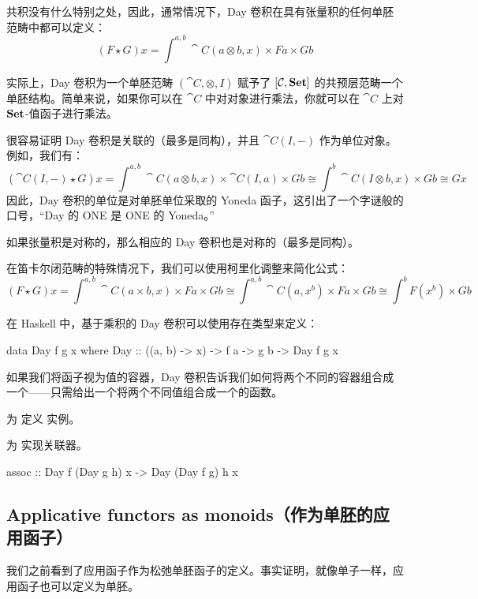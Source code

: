 \documentclass[DaoFP]{subfiles}
\begin{document}
 共积没有什么特别之处，因此，通常情况下，Day 卷积在具有张量积的任何单胚范畴中都可以定义：
 \[ (F \star G) x = \int^{a, b} \cat C (a \otimes b, x) \times F a \times G b \]

 实际上，Day 卷积为一个单胚范畴 $(\cat C, \otimes, I)$ 赋予了 $[\mathcal{C}, \mathbf{Set}]$ 的共预层范畴一个单胚结构。简单来说，如果你可以在 $\cat C$ 中对对象进行乘法，你就可以在 $\cat C$ 上对 $\mathbf{Set}$-值函子进行乘法。

 很容易证明 Day 卷积是关联的（最多是同构），并且 $\cat C(I, -)$ 作为单位对象。例如，我们有：
 \[ (\cat C(I, -) \star G) x =  \int^{a, b} \cat C (a \otimes b, x) \times \cat C(I, a) \times G b \cong
 \int^{b} \cat C (I \otimes b, x) \times  G b \cong G x\]
 因此，Day 卷积的单位是对单胚单位采取的 Yoneda 函子，这引出了一个字谜般的口号，“Day 的 ONE 是 ONE 的 Yoneda。”

 如果张量积是对称的，那么相应的 Day 卷积也是对称的（最多是同构）。

 在笛卡尔闭范畴的特殊情况下，我们可以使用柯里化调整来简化公式：
 \[ (F \star G) x = \int^{a, b} \cat C (a \times b, x) \times F a \times G b \cong  \int^{a, b} \cat C (a, x^b) \times F a \times G b \cong  \int^{b}  F (x^b) \times G b\]

 在 Haskell 中，基于乘积的 Day 卷积可以使用存在类型来定义：
 \begin{haskell}
  data Day f g x where
  Day :: ((a, b) -> x) -> f a -> g b -> Day f g x
 \end{haskell}

 如果我们将函子视为值的容器，Day 卷积告诉我们如何将两个不同的容器组合成一个——只需给出一个将两个不同值组合成一个的函数。

 \begin{exercise}
  为  定义  实例。
 \end{exercise}

 \begin{exercise}
  为  实现关联器。
  \begin{haskell}
   assoc :: Day f (Day g h) x -> Day (Day f g) h x
  \end{haskell}
 \end{exercise}

 \subsection{Applicative functors as monoids（作为单胚的应用函子）}

 我们之前看到了应用函子作为松弛单胚函子的定义。事实证明，就像单子一样，应用函子也可以定义为单胚。
\end{document}
